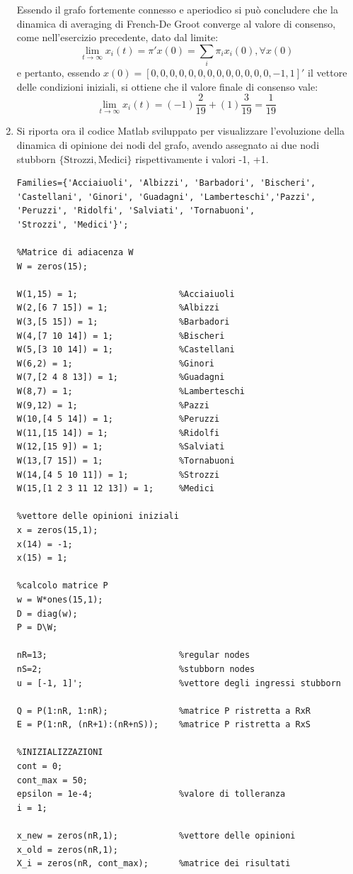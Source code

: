 \documentclass[13pt,largemargins]{homework}
\begin{document}
\begin{enumerate}[label=(\alph*)]
	Essendo il grafo fortemente connesso e aperiodico si può concludere che la dinamica di averaging di French-De Groot converge al valore di consenso, come nell'esercizio precedente, dato dal limite: 
\[\lim_{t \to \infty}x_i(t)=\pi ' x(0)= \sum_i 	\pi_i x_i(0), \forall x(0)\] e pertanto, essendo $x(0)=[0,0,0,0,0,0,0,0,0,0,0,0,0, -1, 1]'$ il vettore delle condizioni iniziali, si ottiene che il valore finale di consenso vale: 
\[\lim_{t \to \infty}x_i(t)= (-1)\frac{2}{19}+(1)\frac{3}{19}=\frac{1}{19}\]

\item %
Si riporta ora il codice Matlab sviluppato per visualizzare l'evoluzione della dinamica di opinione dei nodi del grafo, avendo assegnato ai due nodi stubborn \(\{\text{Strozzi}, \text{Medici}\}\)  rispettivamente i valori -1, +1. 


\begin{lstlisting}
Families={'Acciaiuoli', 'Albizzi', 'Barbadori', 'Bischeri',
'Castellani', 'Ginori', 'Guadagni', 'Lamberteschi','Pazzi',
'Peruzzi', 'Ridolfi', 'Salviati', 'Tornabuoni',
'Strozzi', 'Medici'}'; 

%Matrice di adiacenza W
W = zeros(15); 

W(1,15) = 1; 					%Acciaiuoli
W(2,[6 7 15]) = 1; 				%Albizzi
W(3,[5 15]) = 1; 				%Barbadori
W(4,[7 10 14]) = 1; 			%Bischeri
W(5,[3 10 14]) = 1; 			%Castellani	
W(6,2) = 1; 					%Ginori
W(7,[2 4 8 13]) = 1; 			%Guadagni
W(8,7) = 1; 					%Lamberteschi
W(9,12) = 1; 					%Pazzi
W(10,[4 5 14]) = 1; 			%Peruzzi
W(11,[15 14]) = 1; 				%Ridolfi
W(12,[15 9]) = 1; 				%Salviati
W(13,[7 15]) = 1;        		%Tornabuoni
W(14,[4 5 10 11]) = 1;  		%Strozzi
W(15,[1 2 3 11 12 13]) = 1;     %Medici
		
%vettore delle opinioni iniziali
x = zeros(15,1); 
x(14) = -1; 
x(15) = 1; 

%calcolo matrice P
w = W*ones(15,1); 
D = diag(w); 
P = D\W; 

nR=13;            				%regular nodes
nS=2;             				%stubborn nodes
u = [-1, 1]';     				%vettore degli ingressi stubborn

Q = P(1:nR, 1:nR);   			%matrice P ristretta a RxR
E = P(1:nR, (nR+1):(nR+nS)); 	%matrice P ristretta a RxS

%INIZIALIZZAZIONI
cont = 0; 
cont_max = 50; 
epsilon = 1e-4; 				%valore di tolleranza
i = 1; 

x_new = zeros(nR,1); 			%vettore delle opinioni 
x_old = zeros(nR,1); 
X_i = zeros(nR, cont_max);      %matrice dei risultati



\end{lstlisting}
\end{enumerate}
\end{document}
